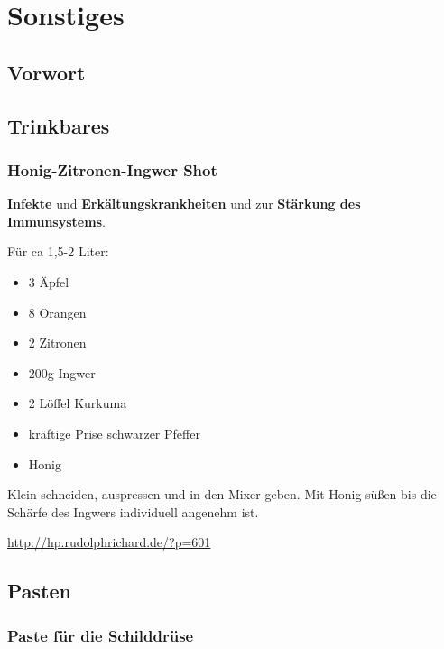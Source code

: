\chapter{Sonstiges}

\section{Vorwort}

\lipsum[1-5]
\newpage





\section{Trinkbares}


\subsection{Honig-Zitronen-Ingwer Shot}

\textbf{Infekte} und \textbf{Erkältungskrankheiten} und zur \textbf{Stärkung des Immunsystems}. 

  

Für ca 1,5-2 Liter:
\begin{itemize}
	\item 3 Äpfel
	\item 8 Orangen
	\item 2 Zitronen
	\item 200g Ingwer
	\item 2 Löffel Kurkuma
	\item kräftige Prise schwarzer Pfeffer
	\item Honig
\end{itemize}

Klein schneiden, auspressen und in den Mixer geben. Mit Honig süßen bis die Schärfe des Ingwers individuell angenehm ist.

\url{http://hp.rudolphrichard.de/?p=601}











\section{Pasten}

\subsection{Paste für die Schilddrüse}
 
